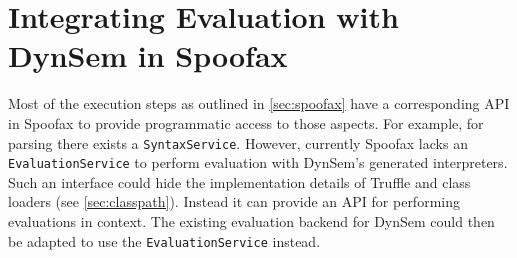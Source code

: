 \section{Integrating Evaluation with DynSem in Spoofax}
\label{sec:adding-an-eval}
Most of the execution steps as outlined in \cref{sec:spoofax} have a
corresponding API in Spoofax to provide programmatic access to those
aspects. For example, for parsing there exists a
\texttt{SyntaxService}. However, currently Spoofax lacks an
\texttt{EvaluationService} to perform evaluation with DynSem's generated
interpreters. Such an interface could hide the implementation details of Truffle
and class loaders (see \cref{sec:classpath}). Instead it can provide an API for
performing evaluations in context. The existing evaluation backend for DynSem
could then be adapted to use the \texttt{EvaluationService} instead.

